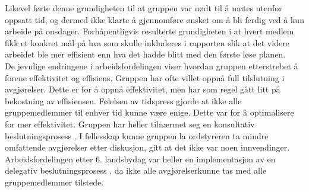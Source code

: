 Likevel førte denne grundigheten til at gruppen var nødt til å møtes utenfor oppsatt tid, og dermed ikke klarte å gjennomføre ønsket om å bli ferdig ved å kun arbeide på onsdager.
Forhåpentligvis resulterte grundigheten i at hvert medlem fikk et konkret mål på hva som skulle inkluderes i rapporten slik at det videre arbeidet ble mer effisient enn hva det hadde blitt med den første løse planen. 
\\
De jevnlige endringene i arbeidsfordelingen viser hvordan gruppen etterstrebet å forene effektivitet og effisiens.
Gruppen har ofte villet oppnå full tilslutning i avgjørelser.
Dette er for å oppnå effektivitet, men har som regel gått litt på bekostning av effisiensen.
Følelsen av tidspress gjorde at ikke alle gruppemedlemmer til enhver tid kunne være enige.
Dette var for å optimalisere for mer effektivitet.
Gruppen har heller tilnærmet seg en konsultativ beslutningsprosess \cite{schwarz}.
I fellesskap kunne gruppen la ordstyreren ta mindre omfattende avgjørelser etter diskusjon, gitt at det ikke var noen innvendinger.
Arbeidsfordelingen etter 6. landsbydag var heller en implementasjon av en delegativ beslutningsprosess \cite{schwarz}, da ikke alle avgjørelserkunne tas med alle gruppemedlemmer tilstede.
\\

